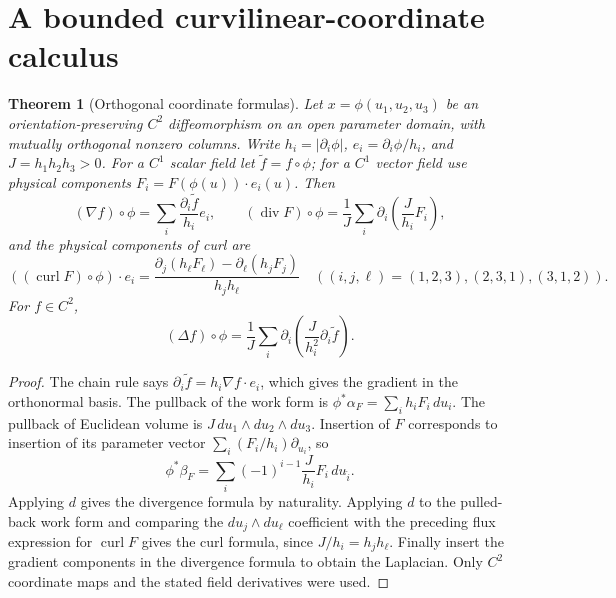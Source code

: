 \documentclass[11pt,oneside,openany]{book}
\newtheorem{theorem}{Theorem}[chapter]
\theoremstyle{definition}
\theoremstyle{remark}
\newcommand{\family}[1]{}
\begin{document}
\section{A bounded curvilinear-coordinate calculus}
\family{K04.11.11}
\begin{theorem}[Orthogonal coordinate formulas]\label{d04:11:orthogonal}
Let $x=\phi(u_1,u_2,u_3)$ be an orientation-preserving $C^2$
diffeomorphism on an open parameter domain, with mutually orthogonal
nonzero columns. Write
$h_i=|\partial_i\phi|$, $e_i=\partial_i\phi/h_i$, and $J=h_1h_2h_3>0$.
For a $C^1$ scalar field let $\widetilde f=f\circ\phi$; for a $C^1$ vector field use
physical components $F_i=F(\phi(u))\cdot e_i(u)$. Then
\[
 (\nabla f)\circ\phi=\sum_i\frac{\partial_i\widetilde f}{h_i}e_i,
 \qquad (\operatorname{div}F)\circ\phi
 =\frac1J\sum_i\partial_i\left(\frac{J}{h_i}F_i\right),
\]
and the physical components of curl are
\[
 ((\operatorname{curl}F)\circ\phi)\cdot e_i
 =\frac{\partial_j(h_\ell F_\ell)-\partial_\ell(h_jF_j)}{h_jh_\ell}
 \quad ((i,j,\ell)=(1,2,3),(2,3,1),(3,1,2)).
\]
For $f\in C^2$,
\[
 (\Delta f)\circ\phi=\frac1J\sum_i
 \partial_i\left(\frac{J}{h_i^2}\partial_i\widetilde f\right).
\]
\end{theorem}
\begin{proof}
The chain rule says $\partial_i\widetilde f=h_i\nabla f\cdot e_i$,
which gives the gradient in the orthonormal basis. The pullback of the
work form is $\phi^*\alpha_F=\sum_i h_iF_i\,du_i$.
The pullback of Euclidean volume is $J\,du_1\wedge du_2\wedge du_3$.
Insertion of $F$ corresponds to insertion of its parameter vector
$\sum_i(F_i/h_i)\partial_{u_i}$, so
\[
 \phi^*\beta_F=\sum_i(-1)^{i-1}\frac{J}{h_i}F_i\,du_{\widehat i}.
\]
Applying $d$ gives the divergence formula by naturality. Applying $d$ to
the pulled-back work form and comparing the $du_j\wedge du_\ell$
coefficient with the preceding flux expression for $\operatorname{curl}F$
gives the curl formula, since $J/h_i=h_jh_\ell$. Finally insert the
gradient components in the divergence formula to obtain the Laplacian.
Only $C^2$ coordinate maps and the stated field derivatives were used.
\end{proof}
\end{document}
